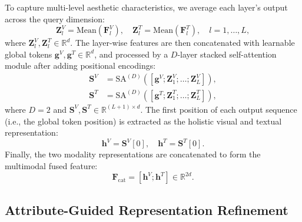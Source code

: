 \documentclass[journal]{IEEEtran}
\begin{document}
To capture multi-level aesthetic characteristics, we average each layer's output across the query dimension:
\begin{equation}
\mathbf{Z}_l^V=\mathrm{Mean}(\mathbf{F}_l^V),\quad
\mathbf{Z}_l^T=\mathrm{Mean}(\mathbf{F}_l^T),\quad l=1,\ldots,L,
\end{equation}
where $\mathbf{Z}_l^V,\mathbf{Z}_l^T\in\mathbb{R}^{d}$. The layer-wise features are then concatenated with learnable global tokens $\mathbf{g}^V,\mathbf{g}^T\in\mathbb{R}^{d}$, and processed by a $D$-layer stacked self-attention module after adding positional encodings:
\begin{equation}
\begin{aligned}
\mathbf{S}^{V}&=\mathrm{SA}^{(D)}([\mathbf{g}^{V};\mathbf{Z}_{1}^{V};\ldots;\mathbf{Z}_{L}^{V}]),\\
\mathbf{S}^{T}&=\mathrm{SA}^{(D)}([\mathbf{g}^{T};\mathbf{Z}_{1}^{T};\ldots;\mathbf{Z}_{L}^{T}]),
\end{aligned}
\end{equation}
where $D=2$ and $\mathbf{S}^{V},\mathbf{S}^{T}\in\mathbb{R}^{(L+1)\times d}$. The first position of each output sequence (i.e., the global token position) is extracted as the holistic visual and textual representation:
\begin{equation}
\mathbf{h}^{V}=\mathbf{S}^{V}[0],\quad \mathbf{h}^{T}=\mathbf{S}^{T}[0].
\end{equation}
Finally, the two modality representations are concatenated to form the multimodal fused feature:
\begin{equation}
\mathbf{F}_{\mathrm{cat}}=[\mathbf{h}^{V};\mathbf{h}^{T}]\in\mathbb{R}^{2d}.
\end{equation}

\subsection{Attribute-Guided Representation Refinement}
\end{document}
